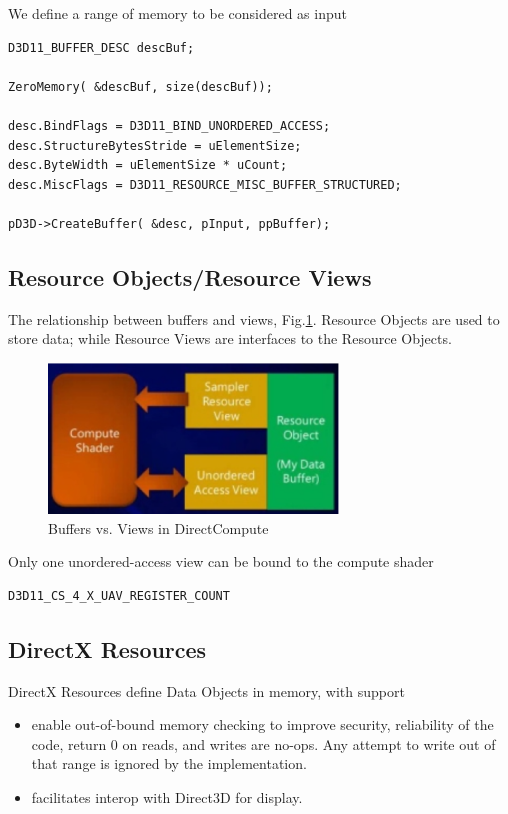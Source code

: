 We define a range of memory to be considered as input
\begin{verbatim}
D3D11_BUFFER_DESC descBuf;

ZeroMemory( &descBuf, size(descBuf));

desc.BindFlags = D3D11_BIND_UNORDERED_ACCESS;
desc.StructureBytesStride = uElementSize;
desc.ByteWidth = uElementSize * uCount;
desc.MiscFlags = D3D11_RESOURCE_MISC_BUFFER_STRUCTURED;

pD3D->CreateBuffer( &desc, pInput, ppBuffer);
\end{verbatim}

\subsection{Resource Objects/Resource Views}

The relationship between buffers and views,
Fig.\ref{fig:DirectCompute_BufferView}. Resource Objects are used to store data;
while Resource Views are interfaces to the Resource Objects.

\begin{figure}[hbt]
  \centerline{\includegraphics[height=4cm,
    angle=0]{./images/DirectCompute_BufferView.eps}}
  \caption{Buffers vs. Views in DirectCompute}
  \label{fig:DirectCompute_BufferView}
\end{figure}


Only one unordered-access view can be bound to the compute shader
\begin{verbatim}
D3D11_CS_4_X_UAV_REGISTER_COUNT
\end{verbatim}

\subsection{DirectX Resources}

DirectX Resources define Data Objects in memory, with support
\begin{itemize}
  \item enable out-of-bound memory checking to improve security, reliability of
  the code, return 0 on reads, and writes are no-ops. Any attempt to write out
  of that range is ignored by the implementation.
  \item facilitates interop with Direct3D for display.
\end{itemize}

